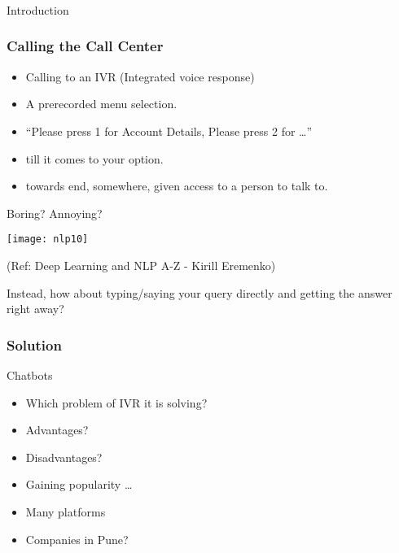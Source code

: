 \begin{frame}[fragile]\frametitle{}
\begin{center}
{\Large Introduction}
\end{center}
\end{frame}


\begin{frame}[fragile]\frametitle{Calling the Call Center}
	\begin{itemize}
	\item Calling to an IVR (Integrated voice response)
	\item A prerecorded menu selection.
	\item ``Please press 1 for Account Details, Please press 2 for \ldots''
	\item till it comes to your option. 
	\item towards end, somewhere, given access to a person to talk to.
	\end{itemize}

Boring? Annoying?
\begin{center}
\texttt{[image: nlp10]}

\tiny{(Ref: Deep Learning and NLP A-Z - Kirill Eremenko)}
\end{center}
Instead, how about typing/saying your query directly and getting the answer right away?

\end{frame}

\begin{frame}[fragile]\frametitle{Solution}
Chatbots

	\begin{itemize}
	\item Which problem of IVR it is solving?
	\item Advantages?
	\item Disadvantages?
	\item Gaining popularity \ldots
	\item Many platforms
	\item Companies in Pune?
	\end{itemize}


\end{frame}

